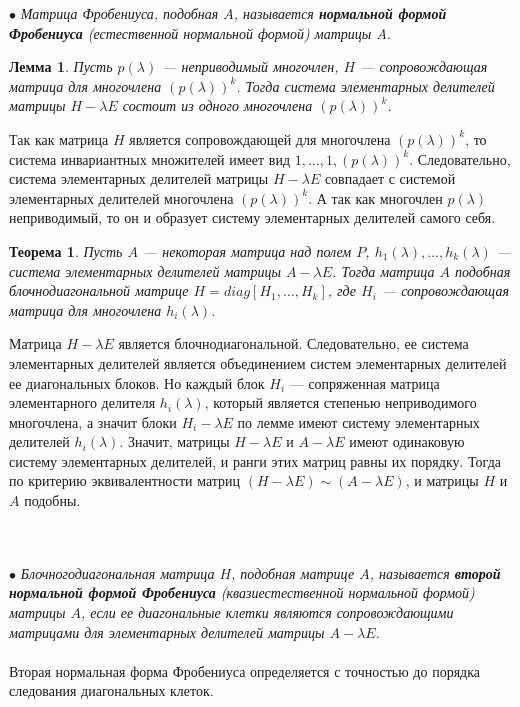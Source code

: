 $\bullet$ \textit{Матрица Фробениуса, подобная $A$, называется \textbf{нормальной формой Фробениуса} (естественной нормальной формой) матрицы $A$.}
\newtheorem*{lem12_11_2}{Лемма}\begin{lem12_11_2}Пусть $p(\lambda)$ --- неприводимый многочлен, $H$ --- сопровождающая матрица для многочлена $(p(\lambda))^k$. Тогда система элементарных делителей матрицы $H-\lambda E$ состоит из одного многочлена $(p(\lambda))^k$.
\end{lem12_11_2}\begin{Proof}
	Так как матрица $H$ является сопровождающей для многочлена $(p(\lambda))^k$, то система инвариантных множителей имеет вид $1,\ldots,1,(p(\lambda))^k$. Следовательно, система элементарных делителей матрицы $H-\lambda E$ совпадает с системой элементарных делителей многочлена $(p(\lambda))^k$. А так как многочлен $p(\lambda)$ неприводимый, то он и образует систему элементарных делителей самого себя.
\end{Proof}
\newtheorem*{th12_11_2}{Теорема}\begin{th12_11_2}Пусть $A$ --- некоторая матрица над полем $P$, $h_1(\lambda),\dots,h_k(\lambda)$ --- система элементарных делителей матрицы $A-\lambda E$. Тогда матрица $A$ подобная блочнодиагональной матрице $H = diag[H_1,\dots,H_k]$, где $H_i$ --- сопровождающая матрица для многочлена $h_i(\lambda)$.
\end{th12_11_2}\begin{Proof}
	Матрица $H-\lambda E$ является блочнодиагональной. Следовательно, ее система элементарных делителей является объединением систем элементарных делителей ее диагональных блоков. Но каждый блок $H_i$ --- сопряженная матрица элементарного делителя $h_i(\lambda)$, который является степенью неприводимого многочлена, а значит блоки $H_i - \lambda E$ по лемме имеют систему элементарных делителей $h_i(\lambda)$. Значит, матрицы $H-\lambda E$ и $A-\lambda E$ имеют одинаковую систему элементарных делителей, и ранги этих матриц равны их порядку. Тогда по критерию эквивалентности матриц $(H-\lambda E)\sim (A-\lambda E)$, и матрицы $H$ и $A$ подобны.
\end{Proof}\\\\
$\bullet$ \textit{Блочногодиагональная матрица $H$, подобная матрице $A$, называется \textbf{второй нормальной формой Фробениуса} (квазиестественной нормальной формой) матрицы $A$, если ее диагональные клетки являются сопровождающими матрицами для элементарных делителей матрицы $A-\lambda E$.}\\\\
Вторая нормальная форма Фробениуса определяется с точностью до порядка следования диагональных клеток.





